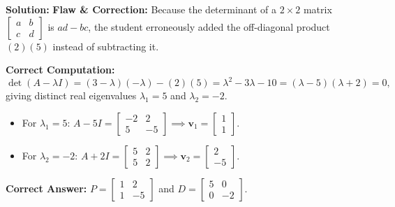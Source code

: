 \documentclass[11pt, letterpaper]{article}
\theoremstyle{definition}
\theoremstyle{remark}
\begin{document}
\textbf{Solution:}
\textbf{Flaw \& Correction:} Because the determinant of a $2 \times 2$ matrix $\begin{bmatrix} a & b \\ c & d \end{bmatrix}$ is $ad - bc$, the student erroneously added the off-diagonal product $(2)(5)$ instead of subtracting it.

\textbf{Correct Computation:}
\[
\det(A - \lambda I) = (3 - \lambda)(-\lambda) - (2)(5) = \lambda^{2} - 3\lambda - 10 = (\lambda - 5)(\lambda + 2) = 0,
\]
giving distinct real eigenvalues $\lambda_{1} = 5$ and $\lambda_{2} = -2$.
\begin{itemize}
    \item For $\lambda_{1} = 5$: $A - 5I = \begin{bmatrix} -2 & 2 \\ 5 & -5 \end{bmatrix} \implies \mathbf{v}_{1} = \begin{bmatrix} 1 \\ 1 \end{bmatrix}$.
    \item For $\lambda_{2} = -2$: $A + 2I = \begin{bmatrix} 5 & 2 \\ 5 & 2 \end{bmatrix} \implies \mathbf{v}_{2} = \begin{bmatrix} 2 \\ -5 \end{bmatrix}$.
\end{itemize}
\textbf{Correct Answer:} $P = \begin{bmatrix} 1 & 2 \\ 1 & -5 \end{bmatrix}$ and $D = \begin{bmatrix} 5 & 0 \\ 0 & -2 \end{bmatrix}$.
\end{document}
